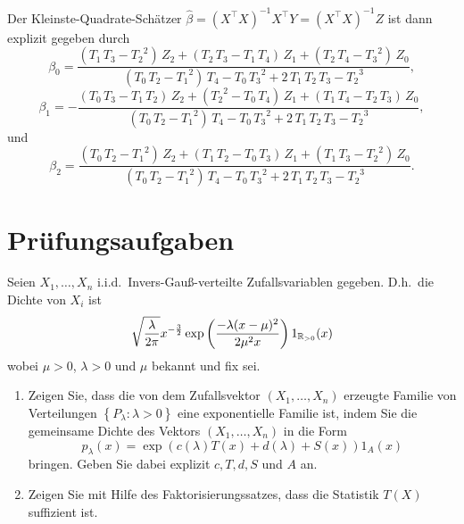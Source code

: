 Der Kleinste-Quadrate-Schätzer 
$\hat \beta = \left( X^\top X \right)^{-1} X^\top Y = \left( X^\top X \right)^{-1} Z$ ist dann explizit
gegeben durch
\begin{equation*}
    \beta_0 = 
\frac{\left({ T_1}\,{ T_3}-{ T_2}^2\right)\,{ Z_2}+
 \left({ T_2}\,{ T_3}-{ T_1}\,{ T_4}\right)\,{ Z_1}+
 \left({ T_2}\,{ T_4}-{ T_3}^2\right)\,{ Z_0}}{
 \left({ T_0}\,{ T_2}-{ T_1}^2\right)\,{ T_4}-{ T_0}\,
 { T_3}^2+2\,{ T_1}\,{ T_2}\,{ T_3}-{ T_2}^3},
\end{equation*}
\begin{equation*}
    \beta_1 = 
-  \frac{\left({ T_0}\,{ T_3}-{ T_1}\,{ T_2}\right)\,
 { Z_2}+\left({ T_2}^2-{ T_0}\,{ T_4}\right)\,{ Z_1}+
 \left({ T_1}\,{ T_4}-{ T_2}\,{ T_3}\right)\,{ Z_0}
 }{\left({ T_0}\,{ T_2}-{ T_1}^2\right)\,{ T_4}-
 { T_0}\,{ T_3}^2+2\,{ T_1}\,{ T_2}\,{ T_3}-{ T_2}^
 3},
\end{equation*}
und
\begin{equation*}
    \beta_2 = 
 \frac{\left({ T_0}\,{ T_2}-{ T_1}^2\right)\,{ Z_2}+
 \left({ T_1}\,{ T_2}-{ T_0}\,{ T_3}\right)\,{ Z_1}+
 \left({ T_1}\,{ T_3}-{ T_2}^2\right)\,{ Z_0}}{
 \left({ T_0}\,{ T_2}-{ T_1}^2\right)\,{ T_4}-{ T_0}\,
 { T_3}^2+2\,{ T_1}\,{ T_2}\,{ T_3}-{ T_2}^3}.
\end{equation*}



\section{Prüfungsaufgaben}

Seien $X_1,\ldots,X_n$ i.i.d.\ Invers-Gauß-verteilte Zufallsvariablen gegeben. D.h.\ die Dichte
von $X_i$ ist 
\begin{equation*}
    \sqrt{\frac{\lambda}{2\pi}} x^{-\frac{3}{2}} \exp\left( \frac{-\lambda(x-\mu)^2}{2\mu^2 x} \right) 1_{\mathbb R_{>0}} (x)
\end{equation*}
wobei $\mu>0$, $\lambda>0$ und $\mu$ bekannt und fix sei.
\begin{enumerate}
    \item Zeigen Sie, dass die von dem Zufallsvektor $( X_1,\ldots,X_n)$
        erzeugte Familie von Verteilungen $\left\{ P_\lambda : \lambda>0
        \right\}$ eine exponentielle Familie ist, indem Sie die gemeinsame
        Dichte des Vektors $(X_1,\ldots,X_n)$ in die Form
        \begin{equation*}
            p_\lambda(x) = \exp\left( c(\lambda) T(x) + d(\lambda) + S(x) \right)1_A (x)
        \end{equation*}
        bringen. Geben Sie dabei explizit $c,T,d,S$ und $A$ an.
    \item Zeigen Sie mit Hilfe des Faktorisierungssatzes, dass die Statistik
        $T(X)$ suffizient ist.
\end{enumerate}

